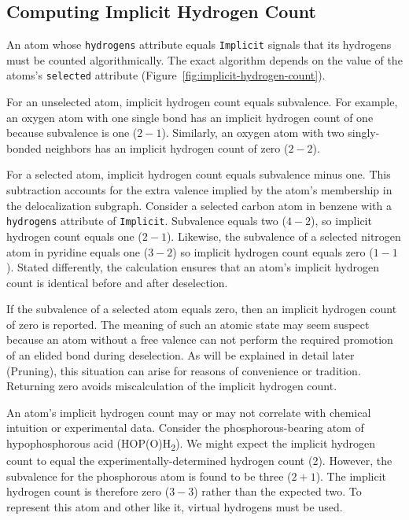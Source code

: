 \documentclass{article}
\def\ttt{\texttt}
\begin{document}
\subsection*{Computing Implicit Hydrogen Count}
\label{computing-implicit-hydrogen-count}

An atom whose \ttt{hydrogens} attribute equals \ttt{Implicit} signals that its hydrogens must be counted algorithmically. The exact algorithm depends on the value of the atoms's \ttt{selected} attribute (Figure~\ref{fig:implicit-hydrogen-count}).

For an unselected atom, implicit hydrogen count equals subvalence. For example, an oxygen atom with one single bond has an implicit hydrogen count of one because subvalence is one ($2 - 1$). Similarly, an oxygen atom with two singly-bonded neighbors has an implicit hydrogen count of zero ($2 - 2$).

For a selected atom, implicit hydrogen count equals subvalence minus one. This subtraction accounts for the extra valence implied by the atom's membership in the delocalization subgraph. Consider a selected carbon atom in benzene with a \ttt{hydrogens} attribute of \ttt{Implicit}. Subvalence equals two ($4 - 2$), so implicit hydrogen count equals one ($2 - 1$). Likewise, the subvalence of a selected nitrogen atom in pyridine equals one ($3 - 2$) so implicit hydrogen count equals zero ($1 - 1$). Stated differently, the calculation ensures that an atom's implicit hydrogen count is identical before and after deselection.

If the subvalence of a selected atom equals zero, then an implicit hydrogen count of zero is reported. The meaning of such an atomic state may seem suspect because an atom without a free valence can not perform the required promotion of an elided bond during deselection. As will be explained in detail later (Pruning), this situation can arise for reasons of convenience or tradition. Returning zero avoids miscalculation of the implicit hydrogen count.

An atom's implicit hydrogen count may or may not correlate with chemical intuition or experimental data. Consider the phosphorous-bearing atom of hypophosphorous acid (HOP(O)H\textsubscript{2}). We might expect the implicit hydrogen count to equal the experimentally-determined hydrogen count (2). However, the subvalence for the phosphorous atom is found to be three ($2 + 1$). The implicit hydrogen count is therefore zero ($3 - 3$) rather than the expected two. To represent this atom and other like it, virtual hydrogens must be used.
\end{document}
